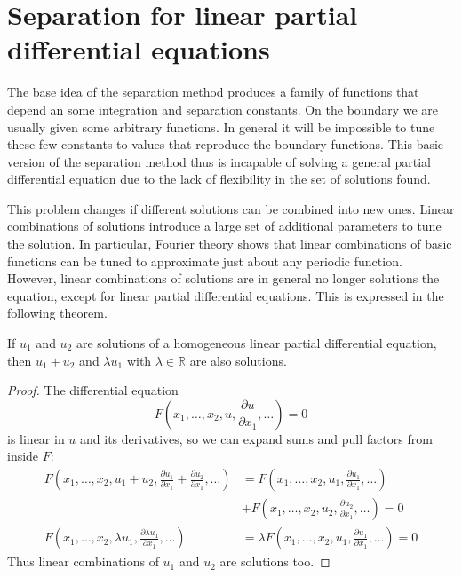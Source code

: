%
%
%
\section{Separation for linear partial differential equations}
The base idea of the separation method produces a family of functions
that depend an some integration and separation constants.
On the boundary we are usually given some arbitrary functions.
In general it will be impossible to tune these few constants to
values that reproduce the boundary functions.
This basic version of the separation method thus is incapable of
solving a general partial differential equation due to the lack
of flexibility in the set of solutions found.

This problem changes if different solutions can be combined into new ones.
Linear combinations of solutions introduce a large set of additional
parameters to tune the solution.
In particular, Fourier theory shows that linear combinations of
basic functions can be tuned to approximate just about any periodic
function.
However, linear combinations of solutions are in general no longer
solutions the equation, except for linear partial differential
equations.
This is expressed in the following theorem.

\begin{satz}
If $u_1$ and $u_2$
are solutions of a homogeneous linear partial differential equation,
then $u_1+u_2$ and $\lambda u_1$ with $\lambda\in\mathbb R$ are also
solutions.
\end{satz}

\begin{proof}
The differential equation
\[
F(x_1,\dots,x_2,u,\frac{\partial u}{\partial x_1},\dots)=0
\]
is linear in $u$ and its derivatives, so we can expand sums and
pull factors from inside $F$:
\begin{align*}
F(x_1,\dots,x_2,u_1+u_2,\frac{\partial u_1}{\partial x_1}+\frac{\partial u_2}{\partial x_1},\dots)
&=
F(x_1,\dots,x_2,u_1,\frac{\partial u_1}{\partial x_1},\dots)
\\
&+
F(x_1,\dots,x_2,u_2,\frac{\partial u_2}{\partial x_1},\dots)=0
\\
F(x_1,\dots,x_2,\lambda u_1,\frac{\partial \lambda u_1}{\partial x_1},\dots)
&=
\lambda
F(x_1,\dots,x_2,u_1,\frac{\partial u_1}{\partial x_1},\dots)
=0
\end{align*}
Thus linear combinations of $u_1$ and $u_2$ are solutions too.
\end{proof}

